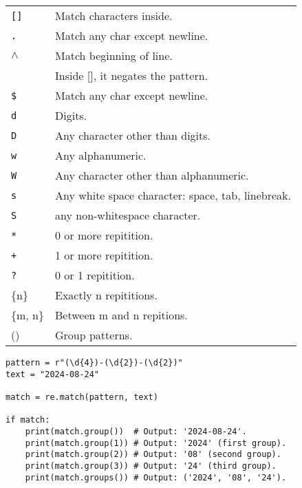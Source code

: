 \begin{tabularx}{\linewidth}{lX}
    \texttt{[]}             & Match characters inside.\\
    \texttt{.}              & Match any char except newline.\\
    \texttt{$\wedge$}       & Match beginning of line.\\
                            & Inside [], it negates the pattern.\\
    \texttt{\$}             & Match any char except newline.\\
    \texttt{d}              & Digits.\\
    \texttt{D}              & Any character other than digits.\\
    \texttt{w}              & Any alphanumeric.\\
    \texttt{W}              & Any character other than alphanumeric.\\
    \texttt{s}              & Any white space character: space, tab, linebreak.\\
    \texttt{S}              & any non-whitespace character.\\
    \texttt{*}              & 0 or more repitition.\\
    \texttt{+}              & 1 or more repitition.\\
    \texttt{?}              & 0 or 1 repitition.\\
    \{n\}                   & Exactly n repititions.\\
    \{m, n\}                & Between m and n repitions.\\
    ()                      & Group patterns.\\
\end{tabularx}

\begin{mdframed}[backgroundcolor=gray!10,linecolor=Firebrick4]
\begin{verbatim}
pattern = r"(\d{4})-(\d{2})-(\d{2})"
text = "2024-08-24"

match = re.match(pattern, text)

if match:
    print(match.group())  # Output: '2024-08-24'. 
    print(match.group(1)) # Output: '2024' (first group).
    print(match.group(2)) # Output: '08' (second group).
    print(match.group(3)) # Output: '24' (third group).
    print(match.groups()) # Output: ('2024', '08', '24').
\end{verbatim}
\end{mdframed}

\pagebreak